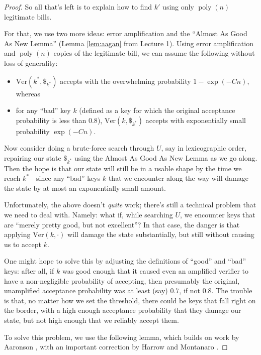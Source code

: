 \documentclass[12pt]{report}
\theoremstyle{plain}
\theoremstyle{definition}
\newcommand{\poly}{\operatorname{poly}}
\begin{document}
\begin{proof}
So all that's left is to explain how to find $k'$ using only $\poly(n)$ legitimate bills.

For that, we use two more ideas: error amplification and the ``Almost As Good As New Lemma'' (Lemma \ref{lem:aagan} from Lecture 1).  Using error amplification and $\poly(n)$ copies of the legitimate bill, we can assume the following without loss of generality:
\begin{itemize}
\item $\mathrm{Ver}(k^\ast, \$_{k^\ast})$ accepts with the overwhelming probability $1-\exp(-Cn)$, whereas
\item for any ``bad'' key $k$ (defined as a key for which the original acceptance probability is less than $0.8$), $\mathrm{Ver}(k, \$_{k^\ast})$ accepts with exponentially small probability $\exp(-Cn)$.
\end{itemize}
Now consider doing a brute-force search through $U$, say in lexicographic order, repairing our state $\$_{k^\ast}$ using the Almost As Good As New Lemma as we go along.  Then the hope is that our state will still be in a usable shape by the time we reach $k^\ast$---since any ``bad'' keys $k$ that we encounter along the way will damage the state by at most an exponentially small amount.

Unfortunately, the above doesn't {\em quite} work; there's still a technical problem that we need to deal with.  Namely: what if, while searching $U$, we encounter keys that are ``merely pretty good, but not excellent''?  In that case, the danger is that applying $\mathrm{Ver}(k,\cdot)$ will damage the state substantially, but still without causing us to accept $k$.

One might hope to solve this by adjusting the definitions of ``good'' and ``bad'' keys: after all, if $k$ was good enough that it caused even an amplified verifier to have a non-negligible probability of accepting, then presumably the original, unamplified acceptance probability was at least (say) $0.7$, if not $0.8$.  The trouble is that, no matter how we set the threshold, there could be keys that fall right on the border, with a high enough acceptance probability that they damage our state, but not high enough that we reliably accept them.

To solve this problem, we use the following lemma, which builds on work by Aaronson \cite{aar:qmaqpoly}, with an important correction by Harrow and Montanaro \cite{hm16}.
\end{proof}
\end{document}
